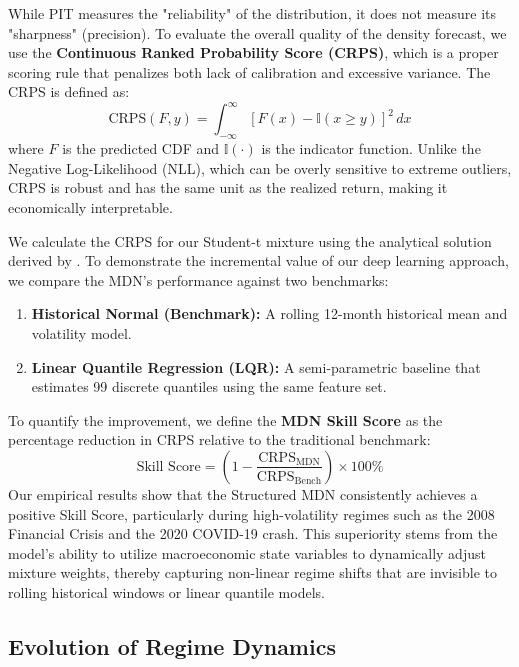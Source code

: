 \documentclass[12pt]{article}
\begin{document}
While PIT measures the "reliability" of the distribution, it does not measure its "sharpness" (precision). To evaluate the overall quality of the density forecast, we use the \textbf{Continuous Ranked Probability Score (CRPS)}, which is a proper scoring rule that penalizes both lack of calibration and excessive variance. The CRPS is defined as:
\begin{equation}
    \text{CRPS}(F, y) = \int_{-\infty}^{\infty} [F(x) - \mathbb{I}(x \geq y)]^2 \, dx
\end{equation}
where $F$ is the predicted CDF and $\mathbb{I}(\cdot)$ is the indicator function. Unlike the Negative Log-Likelihood (NLL), which can be overly sensitive to extreme outliers, CRPS is robust and has the same unit as the realized return, making it economically interpretable.

We calculate the CRPS for our Student-t mixture using the analytical solution derived by . To demonstrate the incremental value of our deep learning approach, we compare the MDN's performance against two benchmarks:
\begin{enumerate}
    \item \textbf{Historical Normal (Benchmark):} A rolling 12-month historical mean and volatility model.
    \item \textbf{Linear Quantile Regression (LQR):} A semi-parametric baseline that estimates 99 discrete quantiles using the same feature set.
\end{enumerate}




To quantify the improvement, we define the \textbf{MDN Skill Score} as the percentage reduction in CRPS relative to the traditional benchmark:
\begin{equation}
    \text{Skill Score} = \left( 1 - \frac{\text{CRPS}_{\text{MDN}}}{\text{CRPS}_{\text{Bench}}} \right) \times 100\%
\end{equation}
Our empirical results show that the Structured MDN consistently achieves a positive Skill Score, particularly during high-volatility regimes such as the 2008 Financial Crisis and the 2020 COVID-19 crash. This superiority stems from the model's ability to utilize macroeconomic state variables to dynamically adjust mixture weights, thereby capturing non-linear regime shifts that are invisible to rolling historical windows or linear quantile models.

\subsection{Evolution of Regime Dynamics}
\end{document}
